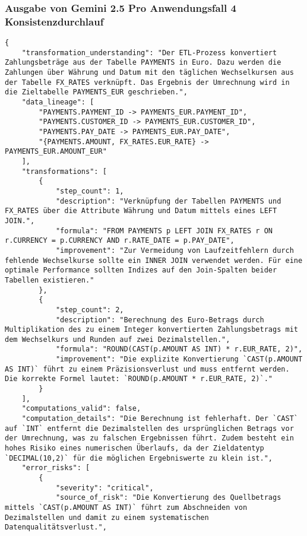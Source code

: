 \subsubsection{Ausgabe von Gemini 2.5 Pro Anwendungsfall 4 Konsistenzdurchlauf}\label{anhang:subsubsec:gemini_case4_prompt2}
\begin{lstlisting}[caption={Ausgabe: Gemini 2.5 Pro Anwendungsfall 4 Konsistenzdurchlauf},label={gemini_case4_prompt2}]
{
    "transformation_understanding": "Der ETL-Prozess konvertiert Zahlungsbeträge aus der Tabelle PAYMENTS in Euro. Dazu werden die Zahlungen über Währung und Datum mit den täglichen Wechselkursen aus der Tabelle FX_RATES verknüpft. Das Ergebnis der Umrechnung wird in die Zieltabelle PAYMENTS_EUR geschrieben.",
    "data_lineage": [
        "PAYMENTS.PAYMENT_ID -> PAYMENTS_EUR.PAYMENT_ID",
        "PAYMENTS.CUSTOMER_ID -> PAYMENTS_EUR.CUSTOMER_ID",
        "PAYMENTS.PAY_DATE -> PAYMENTS_EUR.PAY_DATE",
        "{PAYMENTS.AMOUNT, FX_RATES.EUR_RATE} -> PAYMENTS_EUR.AMOUNT_EUR"
    ],
    "transformations": [
        {
            "step_count": 1,
            "description": "Verknüpfung der Tabellen PAYMENTS und FX_RATES über die Attribute Währung und Datum mittels eines LEFT JOIN.",
            "formula": "FROM PAYMENTS p LEFT JOIN FX_RATES r ON r.CURRENCY = p.CURRENCY AND r.RATE_DATE = p.PAY_DATE",
            "improvement": "Zur Vermeidung von Laufzeitfehlern durch fehlende Wechselkurse sollte ein INNER JOIN verwendet werden. Für eine optimale Performance sollten Indizes auf den Join-Spalten beider Tabellen existieren."
        },
        {
            "step_count": 2,
            "description": "Berechnung des Euro-Betrags durch Multiplikation des zu einem Integer konvertierten Zahlungsbetrags mit dem Wechselkurs und Runden auf zwei Dezimalstellen.",
            "formula": "ROUND(CAST(p.AMOUNT AS INT) * r.EUR_RATE, 2)",
            "improvement": "Die explizite Konvertierung `CAST(p.AMOUNT AS INT)` führt zu einem Präzisionsverlust und muss entfernt werden. Die korrekte Formel lautet: `ROUND(p.AMOUNT * r.EUR_RATE, 2)`."
        }
    ],
    "computations_valid": false,
    "computation_details": "Die Berechnung ist fehlerhaft. Der `CAST` auf `INT` entfernt die Dezimalstellen des ursprünglichen Betrags vor der Umrechnung, was zu falschen Ergebnissen führt. Zudem besteht ein hohes Risiko eines numerischen Überlaufs, da der Zieldatentyp `DECIMAL(10,2)` für die möglichen Ergebniswerte zu klein ist.",
    "error_risks": [
        {
            "severity": "critical",
            "source_of_risk": "Die Konvertierung des Quellbetrags mittels `CAST(p.AMOUNT AS INT)` führt zum Abschneiden von Dezimalstellen und damit zu einem systematischen Datenqualitätsverlust.",

\end{lstlisting}
